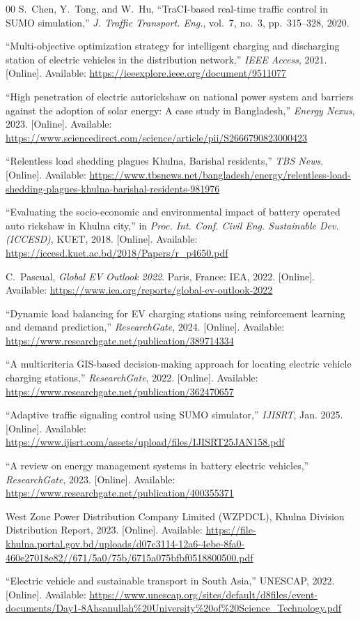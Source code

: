\documentclass[conference]{IEEEtran}
\begin{document}
\begin{thebibliography}{00}
S.~Chen, Y.~Tong, and W.~Hu, ``TraCI-based real-time traffic control in SUMO simulation,'' \textit{J. Traffic Transport. Eng.}, vol.~7, no.~3, pp.~315--328, 2020.

``Multi-objective optimization strategy for intelligent charging and discharging station of electric vehicles in the distribution network,'' \textit{IEEE Access}, 2021. [Online]. Available: \url{https://ieeexplore.ieee.org/document/9511077}

``High penetration of electric autorickshaw on national power system and barriers against the adoption of solar energy: A case study in Bangladesh,'' \textit{Energy Nexus}, 2023. [Online]. Available: \url{https://www.sciencedirect.com/science/article/pii/S2666790823000423}

``Relentless load shedding plagues Khulna, Barishal residents,'' \textit{TBS News}. [Online]. Available: \url{https://www.tbsnews.net/bangladesh/energy/relentless-load-shedding-plagues-khulna-barishal-residents-981976}

``Evaluating the socio-economic and environmental impact of battery operated auto rickshaw in Khulna city,'' in \textit{Proc. Int. Conf. Civil Eng. Sustainable Dev. (ICCESD)}, KUET, 2018. [Online]. Available: \url{https://iccesd.kuet.ac.bd/2018/Papers/r_p4650.pdf}

C.~Pascual, \textit{Global EV Outlook 2022}. Paris, France: IEA, 2022. [Online]. Available: \url{https://www.iea.org/reports/global-ev-outlook-2022}

``Dynamic load balancing for EV charging stations using reinforcement learning and demand prediction,'' \textit{ResearchGate}, 2024. [Online]. Available: \url{https://www.researchgate.net/publication/389714334}

``A multicriteria GIS-based decision-making approach for locating electric vehicle charging stations,'' \textit{ResearchGate}, 2022. [Online]. Available: \url{https://www.researchgate.net/publication/362470657}

``Adaptive traffic signaling control using SUMO simulator,'' \textit{IJISRT}, Jan. 2025. [Online]. Available: \url{https://www.ijisrt.com/assets/upload/files/IJISRT25JAN158.pdf}

``A review on energy management systems in battery electric vehicles,'' \textit{ResearchGate}, 2023. [Online]. Available: \url{https://www.researchgate.net/publication/400355371}

West Zone Power Distribution Company Limited (WZPDCL), Khulna Division Distribution Report, 2023. [Online]. Available: \url{https://file-khulna.portal.gov.bd/uploads/d07c3114-12a6-4ebe-8fa0-460e27018e82//671/5a0/75b/6715a075bfbf0518800500.pdf}

``Electric vehicle and sustainable transport in South Asia,'' UNESCAP, 2022. [Online]. Available: \url{https://www.unescap.org/sites/default/d8files/event-documents/Day1-8Ahsanullah\%20University\%20of\%20Science_Technology.pdf}

\end{thebibliography}
\end{document}
